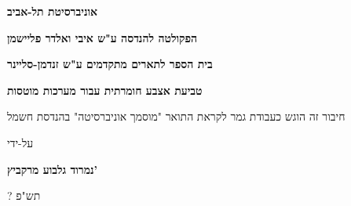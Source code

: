 \begin{otherlanguage}{hebrew}
\begin{center}
\begin{davidfont}
  \vspace*{1cm}
  
  \large
  \textbf{אוניברסיטת תל-אביב}
   
  \footnotesize
  \textbf{הפקולטה להנדסה ע"ש איבי ואלדר פליישמן}
   
  \textbf{בית הספר לתארים מתקדמים ע"ש זנדמן-סליינר}
  
  \vspace{1.2cm}
  \LARGE
  \textbf{טביעת אצבע חומרתית עבור מערכות מוטסות}
   
  \vspace{1.5cm}
   
  \normalsize
  חיבור זה הוגש כעבודת גמר לקראת התואר "מוסמך אוניברסיטה" בהנדסת חשמל
   
  \vspace{0.5cm}
  על-ידי
   
  \Large
  \textbf{נמרוד גלבוע מרקביץ'}
  
  \vspace{0.5cm}
  \large
  ? תש"פ
\end{davidfont}
\end{center}
\end{otherlanguage}
